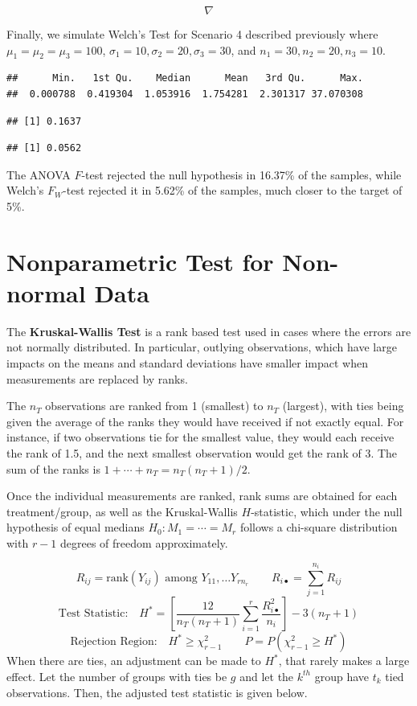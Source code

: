 \documentclass[
]{book}
\begin{document}
\[
\nabla
\]

Finally, we simulate Welch's Test for Scenario 4 described previously
where \(\mu_1=\mu_2=\mu_3=100\),
\(\sigma_1=10,\sigma_2=20,\sigma_3=30\), and \(n_1=30,n_2=20,n_3=10\).

\begin{verbatim}
##      Min.   1st Qu.    Median      Mean   3rd Qu.      Max. 
##  0.000788  0.419304  1.053916  1.754281  2.301317 37.070308
\end{verbatim}

\begin{verbatim}
## [1] 0.1637
\end{verbatim}

\begin{verbatim}
## [1] 0.0562
\end{verbatim}

The ANOVA \(F\)-test rejected the null hypothesis in 16.37\% of the
samples, while Welch's \(F_W\)-test rejected it in 5.62\% of the
samples, much closer to the target of 5\%.

\section{Nonparametric Test for Non-normal
Data}\label{nonparametric-test-for-non-normal-data}

The \textbf{Kruskal-Wallis Test} is a rank based test used in cases
where the errors are not normally distributed. In particular, outlying
observations, which have large impacts on the means and standard
deviations have smaller impact when measurements are replaced by ranks.

The \(n_T\) observations are ranked from 1 (smallest) to \(n_T\)
(largest), with ties being given the average of the ranks they would
have received if not exactly equal. For instance, if two observations
tie for the smallest value, they would each receive the rank of 1.5, and
the next smallest observation would get the rank of 3. The sum of the
ranks is \(1+\cdots+n_T=n_T\left(n_T+1\right)/2\).

Once the individual measurements are ranked, rank sums are obtained for
each treatment/group, as well as the Kruskal-Wallis \(H\)-statistic,
which under the null hypothesis of equal medians \(H_0:M_1=\cdots=M_r\)
follows a chi-square distribution with \(r-1\) degrees of freedom
approximately.

\[
R_{ij} = \mbox{rank}\left(Y_{ij}\right) \mbox{ among } Y_{11},\ldots Y_{rn_r}
\qquad R_{i\bullet} = \sum_{j=1}^{n_i}R_{ij} 
\] \[
\mbox{Test Statistic:} \quad 
H^*=\left[\frac{12}{n_T\left(n_T+1\right)}\sum_{i=1}^r\frac{R_{i\bullet}^2}{n_i}\right] -
3\left(n_T+1\right) 
\] \[
\mbox{Rejection Region:} \quad H^* \ge \chi_{r-1}^2   \qquad
P=P\left(\chi_{r-1}^2 \geq H^*\right)
\] When there are ties, an adjustment can be made to \(H^*\), that
rarely makes a large effect. Let the number of groups with ties be \(g\)
and let the \(k^{th}\) group have \(t_k\) tied observations. Then, the
adjusted test statistic is given below.
\end{document}
